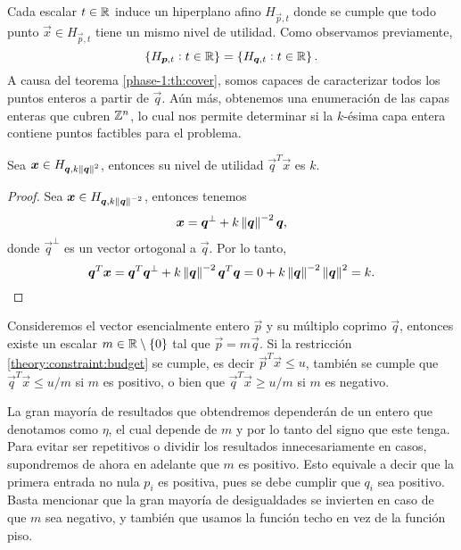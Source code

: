 Cada escalar $t \in \mathbb{R}$ induce un hiperplano afino $H_{\vec{p}, t}$ donde se cumple que todo punto
$\vec{x} \in H_{\vec{p}, t}$ tiene un mismo nivel de utilidad. Como observamos previamente,
\begin{equation*}
	\left \lbrace H_{\boldsymbol{p}, t} \vcentcolon t \in \mathbb{R} \right\rbrace
	=
	\left \lbrace H_{\boldsymbol{q}, t} \vcentcolon t \in \mathbb{R} \right\rbrace.
\end{equation*}
A causa del teorema \ref{phase-1:th:cover}, somos capaces de caracterizar todos los puntos enteros a
partir de $\vec{q}$. Aún más, obtenemos una enumeración de las capas enteras que cubren $\mathbb{Z}^n$, lo
cual nos permite determinar si la $k$-ésima capa entera contiene puntos factibles para el problema.

\begin{lemma}
	\label{theory:lemma:utility}
	Sea $\boldsymbol{x} \in H_{\boldsymbol{q}, k\left\lVert \boldsymbol{q} \right\rVert^2}$, entonces su nivel de utilidad
	$\vec{q}^T\vec{x}$ es $k$.
\end{lemma}
\begin{proof}
	Sea $\boldsymbol{x} \in H_{\boldsymbol{q}, k\left\lVert \boldsymbol{q} \right\rVert^{-2}}$, entonces tenemos
	\begin{equation*}
		\boldsymbol{x} = \boldsymbol{q}^{\perp} + k\left\lVert \boldsymbol{q} \right\rVert^{-2}\boldsymbol{q},
	\end{equation*}
	donde $\vec{q}^{\perp}$ es un vector ortogonal a $\vec{q}$. Por lo tanto,
	\begin{equation*}
		\boldsymbol{q}^T\boldsymbol{x} = \boldsymbol{q}^T\boldsymbol{q}^{\perp} + k\left\lVert \boldsymbol{q} \right\rVert^{-2}\boldsymbol{q}^T\boldsymbol{q}
		= 0 + k \left\lVert \boldsymbol{q} \right\rVert^{-2} \left\lVert \boldsymbol{q} \right\rVert^{2} = k.
	\end{equation*}
\end{proof}

Consideremos el vector esencialmente entero $\vec{p}$ y su múltiplo coprimo $\vec{q}$, entonces
existe un escalar $m \in \mathbb{R} \setminus \lbrace 0 \rbrace$ tal que $\vec{p} = m\vec{q}$. Si la
restricción \eqref{theory:constraint:budget} se cumple, es decir $\vec{p}^T\vec{x} \leq u$, también
se cumple que $\vec{q}^T\vec{x} \leq u/m$ si $m$ es positivo, o bien que $\vec{q}^T\vec{x} \geq u/m$
si $m$ es negativo.

La gran mayoría de resultados que obtendremos dependerán de un entero que denotamos como $\eta$, el
cual depende de $m$ y por lo tanto del signo que este tenga. Para evitar ser repetitivos o dividir
los resultados innecesariamente en casos, supondremos de ahora en adelante que $m$ es positivo. Esto
equivale a decir que la primera entrada no nula $p_i$ es positiva, pues se debe cumplir que $q_i$
sea positivo. Basta mencionar que la gran mayoría de desigualdades se invierten en caso de que $m$
sea negativo, y también que usamos la función techo en vez de la función piso.

